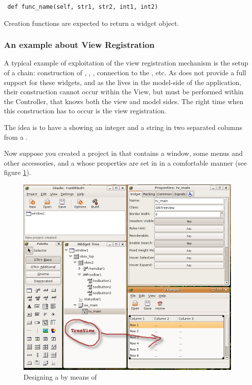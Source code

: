 { \codesize 
\begin{verbatim}
 def func_name(self, str1, str2, int1, int2)
\end{verbatim}
}

Creation functions are expected to return a widget object.


\subsubsection{\label{VR:EX}An example about View Registration}
A typical example of exploitation of the view registration mechanism
is the setup of a  chain: construction of
, ,
, connection to the , etc.
As \glade does not provide a full support for these widgets, and as
the  lives in the model-side of the application,
their construction cannot occur within the View, but must be performed
within the Controller, that knows both the view and model sides. The
right time when this construction has to occur is the view
registration.

The idea is to have a  showing an integer and a
string in two separated columns from a .  

Now suppose you created a project in \glade that contains a window,
some menus and other accessories, and a  whose
properties are set in \glade in a comfortable manner (see figure
\ref{fig:VR}).

\begin{figure}[here]
\begin{center}
\includegraphics[width=12cm]{figs/png/treeview}
\caption{\label{fig:VR}Designing a  by means of \glade }
\end{center}
\end{figure}

